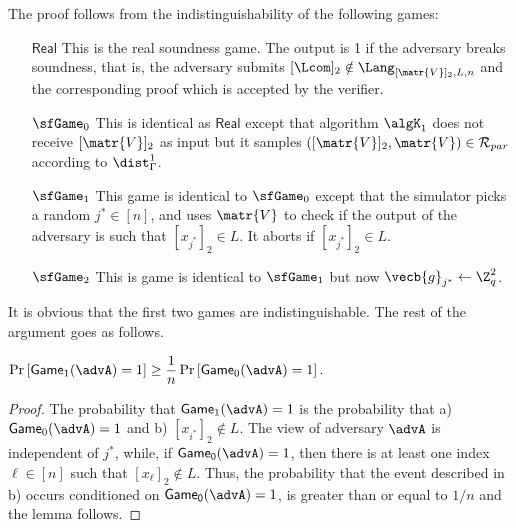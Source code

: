The proof follows from the indistinguishability of the following games:
\begin{itemize}
\item[$\mathsf{Real}$] This is the real soundness game. The output is 1 if the adversary breaks soundness, that is, the adversary submits $[\Lcom]_2\notin\Lang_{[\matr{V}]_2,L,n}$ and the corresponding proof which is accepted by the verifier.
\item[$\sfGame_0$] This is identical as $\mathsf{Real}$ except that algorithm $\algK_1$ does not receive $[\matr{V}]_2$ as input but it samples $([\matr{V}]_2,\matr{V})\in\mathcal{R}_{par}$ according to $\dist^1_\Gamma$.
\item[$\sfGame_1$] This game is identical to $\sfGame_0$ except that the simulator picks a random $j^*\in[n]$, and uses $\matr{V}$ to check if the output of the adversary is such that $[x_{j^*}]_2\in L$. It aborts if $[x_{j^*}]_2\in L$.
\item[$\sfGame_2$] This is game is identical to $\sfGame_1$ but now $\vecb{g}_{j^*}\gets\Z_q^2$.
\end{itemize}

It is obvious that the first two games are indistinguishable. 
The rest of the argument goes as follows. 

\begin{lemma} $\Pr\left[ \mathsf{Game}_1(\advA)=1\right]\geq\dfrac{1}{n}\Pr\left[\mathsf{Game}_0(\advA)=1\right].$
\end{lemma}

\begin{proof}  The probability that
 $\mathsf{Game}_1(\advA)=1$ is the probability that  a) $\mathsf{Game}_0(\advA)=1$ and
b)  $[x_{i^*}]_2 \notin L$. The view of adversary $\advA$ is independent of $j^*$, while, if $\mathsf{Game_0}(\advA)=1$, then there is at least one index $\ell \in [n]$ such that $[x_{\ell}]_2 \notin L$. Thus, 
the probability that the event described in b) occurs conditioned on $\mathsf{Game_0}(\advA)=1$, is greater than or equal to $1/n$ and the lemma follows.
\end{proof}

